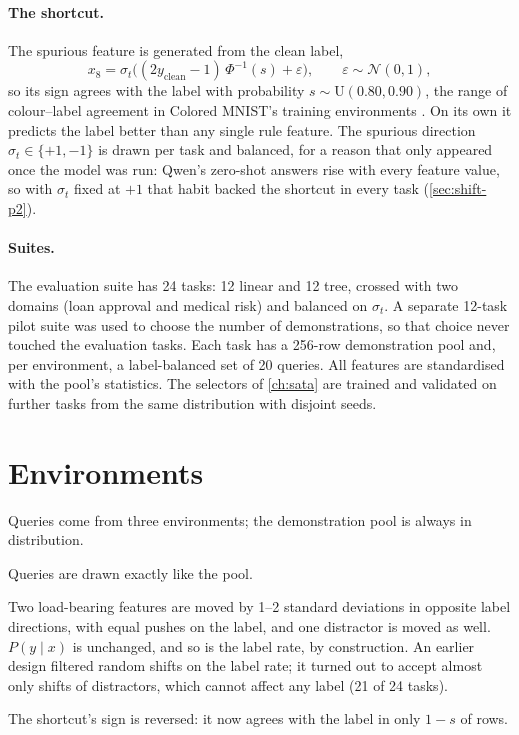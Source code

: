 \paragraph{The shortcut.}
The spurious feature is generated from the clean label,
\[
  x_8 = \sigma_t\big((2y_{\mathrm{clean}} - 1)\,\Phi^{-1}(s) + \varepsilon\big), \qquad \varepsilon \sim \mathcal{N}(0,1),
\]
so its sign agrees with the label with probability $s \sim \mathrm{U}(0.80, 0.90)$, the range of colour--label agreement in Colored MNIST's training environments \citep{arjovsky2019invariant}.
On its own it predicts the label better than any single rule feature.
The spurious direction $\sigma_t \in \{+1, -1\}$ is drawn per task and balanced, for a reason that only appeared once the model was run: Qwen's zero-shot answers rise with every feature value, so with $\sigma_t$ fixed at $+1$ that habit backed the shortcut in every task (\autoref{sec:shift-p2}).

\paragraph{Suites.}
The evaluation suite has 24 tasks: 12 linear and 12 tree, crossed with two domains (loan approval and medical risk) and balanced on $\sigma_t$.
A separate 12-task pilot suite was used to choose the number of demonstrations, so that choice never touched the evaluation tasks.
Each task has a 256-row demonstration pool and, per environment, a label-balanced set of 20 queries.
All features are standardised with the pool's statistics.
The selectors of \autoref{ch:sata} are trained and validated on further tasks from the same distribution with disjoint seeds.

\section{Environments}
\label{sec:environments}

Queries come from three environments; the demonstration pool is always in distribution.

\begin{description}[leftmargin=1.5em, style=nextline]
  \item[In distribution (ID)] Queries are drawn exactly like the pool.
  \item[Covariate shift] Two load-bearing features are moved by 1--2 standard deviations in opposite label directions, with equal pushes on the label, and one distractor is moved as well.
        $P(y \mid x)$ is unchanged, and so is the label rate, by construction.
        An earlier design filtered random shifts on the label rate; it turned out to accept almost only shifts of distractors, which cannot affect any label (21 of 24 tasks).
  \item[Spurious reversal] The shortcut's sign is reversed: it now agrees with the label in only $1-s$ of rows.
\end{description}

